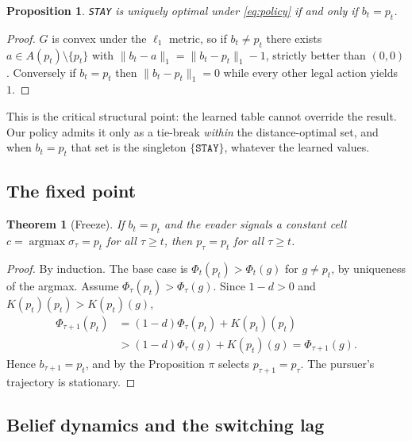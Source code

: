 \documentclass[conference]{IEEEtran}
\newtheorem{theorem}{Theorem}
\newtheorem{proposition}{Proposition}
\begin{document}
\begin{proposition}
\texttt{STAY} is uniquely optimal under \eqref{eq:policy} if and only if
$b_t = p_t$.
\end{proposition}

\begin{proof}
$G$ is convex under the $\ell_1$ metric, so if $b_t \neq p_t$ there exists
$a \in A(p_t)\setminus\{p_t\}$ with
$\|b_t - a\|_1 = \|b_t - p_t\|_1 - 1$, strictly better than $(0,0)$.
Conversely if $b_t = p_t$ then $\|b_t - p_t\|_1 = 0$ while every other legal
action yields $1$.
\end{proof}

This is the critical structural point: the learned table cannot override the
result. Our policy admits it only as a tie-break \emph{within} the
distance-optimal set, and when $b_t = p_t$ that set is the singleton
$\{\texttt{STAY}\}$, whatever the learned values.

\subsection{The fixed point}

\begin{theorem}[Freeze]
If $b_t = p_t$ and the evader signals a constant cell
$c = \operatorname{argmax}\sigma_\tau = p_t$ for all $\tau \ge t$, then
$p_\tau = p_t$ for all $\tau \ge t$.
\end{theorem}

\begin{proof}
By induction. The base case is $\Phi_t(p_t) > \Phi_t(g)$ for $g \neq p_t$, by
uniqueness of the argmax. Assume $\Phi_\tau(p_t) > \Phi_\tau(g)$. Since
$1-d>0$ and $K(p_t)(p_t) > K(p_t)(g)$,
\begin{align}
\Phi_{\tau+1}(p_t) &= (1-d)\Phi_\tau(p_t) + K(p_t)(p_t)\\
&> (1-d)\Phi_\tau(g) + K(p_t)(g) = \Phi_{\tau+1}(g).
\end{align}
Hence $b_{\tau+1}=p_t$, and by the Proposition $\pi$ selects
$p_{\tau+1}=p_\tau$. The pursuer's trajectory is stationary.
\end{proof}

\subsection{Belief dynamics and the switching lag}
\end{document}
